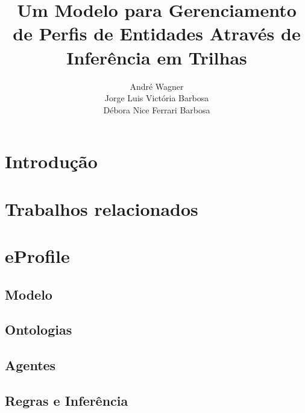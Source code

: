 \documentclass[a4paper,twocolumn]{article}
\author{André Wagner \\ Jorge Luis Victória Barbosa \\ Débora Nice Ferrari Barbosa}
\title{Um Modelo para Gerenciamento de Perfis de Entidades Através de Inferência em Trilhas}
\date{}
\begin{document}
\maketitle

\section{Introdução}
\label{sec:introducao}


\section{Trabalhos relacionados}
\label{sec:relacionados}


\section{eProfile}
\label{sec:eprofile}


  \subsection{Modelo}
  \label{sec:modelo}
  

  \subsection{Ontologias}
  \label{sec:ontologias}
  

  \subsection{Agentes}
  \label{sec:agentes}
  

  \subsection{Regras e Inferência}
  \label{sec:inferencia}
  

%



\begin{small}
  
\end{small}
\end{document}
